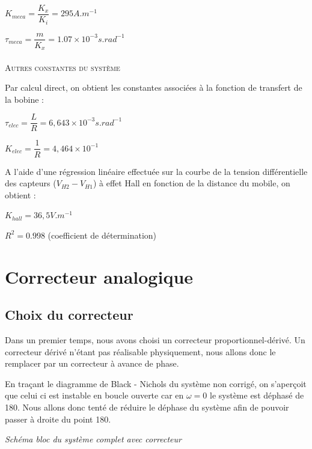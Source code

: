 \documentclass[11pt, french]{article} %
\begin{document}
\medskip
$  K_{meca} = \dfrac {K_x}{K_i} =  295 A.m^{-1} $

\medskip
$  \tau_{meca} = \dfrac m {K_x} = 1.07 \times 10^{-3} s.rad^{-1} $

\paragraph{}
\textsc{Autres constantes du système}

\noindent
Par calcul direct, on obtient les constantes associées à la fonction de transfert de la bobine :

\medskip
$  \tau_{elec} = \dfrac L R = 6,643 \times 10^{-3} s.rad^{-1} $

\medskip
$  K_{elec} = \dfrac 1 R = 4,464 \times 10^{-1} $
\medskip

\noindent
A l'aide d'une régression linéaire effectuée sur la courbe de la tension différentielle des capteurs ($ V_{H2} - V_{H1} $) à effet Hall en fonction de la distance du mobile, on obtient :

\medskip
$  K_{hall} = 36,5 V.m^{-1} $

\medskip
$ R^2 = 0.998 $ (coefficient de détermination)
\medskip

\section{Correcteur analogique}
\subsection{Choix du correcteur}
Dans un premier temps, nous avons choisi un correcteur proportionnel-dérivé. Un correcteur dérivé n'étant pas réalisable physiquement, nous allons donc le remplacer par un correcteur à avance de phase.

\medskip
En traçant le diagramme de Black - Nichols du système non corrigé, on s'aperçoit que celui ci est instable en boucle ouverte car en $\omega = 0$ le système est déphasé de 180. Nous allons donc tenté de réduire le déphase du système afin de pouvoir passer à droite du point 180.

\medskip
\begin{center}

\emph{Schéma bloc du système complet avec correcteur}
\end{center}
\begin{quote}



\end{quote}
\end{document}
